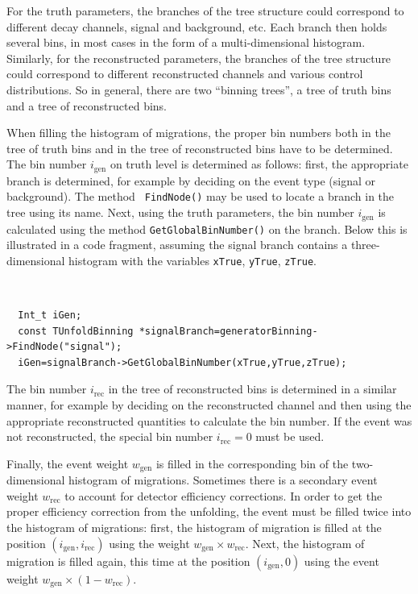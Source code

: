 \documentclass[12pt]{article}
\begin{document}
For the truth parameters, the branches of the tree structure could
correspond to different decay channels, signal and background,
etc. Each branch then holds several bins, in most cases in the form of
a multi-dimensional histogram.
Similarly, for the reconstructed parameters, the branches of the
tree structure could correspond to different reconstructed channels
and various control distributions. 
So in general, there are two ``binning trees'', a tree of truth bins
and a tree of reconstructed bins.

When filling the histogram of migrations, the proper bin numbers both
in the tree of truth bins and in the tree of reconstructed bins have
to be determined. 
The bin number $i_{\text{gen}}$ on truth level is determined as
follows: first, the appropriate branch is determined, for example by
deciding on the event type (signal or background). The method {\tt
  FindNode()} may be used to locate a branch in the tree using its name.
Next, using the truth parameters, the bin number $i_{\text{gen}}$ is
calculated using the method {\tt GetGlobalBinNumber()} on the
branch. Below this is illustrated in a code fragment, assuming the
signal branch contains a three-dimensional histogram with the
variables {\tt xTrue}, {\tt yTrue}, {\tt zTrue}.

{\tt
\begin{verbatim}
  Int_t iGen;
  const TUnfoldBinning *signalBranch=generatorBinning->FindNode("signal");
  iGen=signalBranch->GetGlobalBinNumber(xTrue,yTrue,zTrue);
\end{verbatim}
}

The bin number $i_{\text{rec}}$ in the
tree of reconstructed bins is determined in a similar manner, for
example by deciding on the reconstructed channel and then using the
appropriate reconstructed quantities to calculate the bin number.
If the event was not reconstructed, the special bin number
$i_{\text{rec}}=0$ must be used.

Finally, the event weight $w_{\text{gen}}$ is filled in the
corresponding bin of the two-dimensional histogram of
migrations. Sometimes there is a secondary event weight
$w_{\text{rec}}$ to account for detector efficiency corrections. In
order to get the proper efficiency correction from the unfolding, the
event must be filled twice into the histogram of migrations: first,
the histogram of migration is filled at the position
$(i_{\text{gen}},i_{\text{rec}})$ using the weight
$w_{\text{gen}}\times w_{\text{rec}}$.
Next, the histogram of migration is filled again, this time at the
position $(i_{\text{gen}},0)$  using the event weight $w_{\text{gen}}\times(1-w_{\text{rec}})$.
\end{document}
